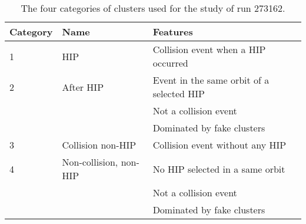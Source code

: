 \begin{table}[h]
\begin{center}
\begin{tabular}{|l|l|l|}
\hline
Category & Name  & Features \\
\hline
1 & HIP & Collision event when a HIP occurred \\
\hline
2 & After HIP & Event in the same orbit of a selected HIP \\
& & Not a collision event \\
& & Dominated by fake clusters \\
\hline
3 & Collision non-HIP & Collision event without any HIP \\
\hline
4 & Non-collision, non-HIP  & No HIP selected in a same orbit \\
& & Not a collision event \\
& & Dominated by fake clusters \\
\hline
\end{tabular}
\caption[Table caption text]{The four categories of clusters used for the study of run 273162. }
\label{tab:eventCategories}
\end{center}
\end{table}


\begin{table}
\begin{center}
\caption[Table caption text]{The average cluster charge, multiplicity and width and the fraction of clusters larger than 10 strips for four categories defined in Tab.~\ref{tab:eventCategories} for run 273162. The quantities are computed from both on-track and off-track clusters.}
\label{tab:clusterCategories}
\end{center}
\end{table}


